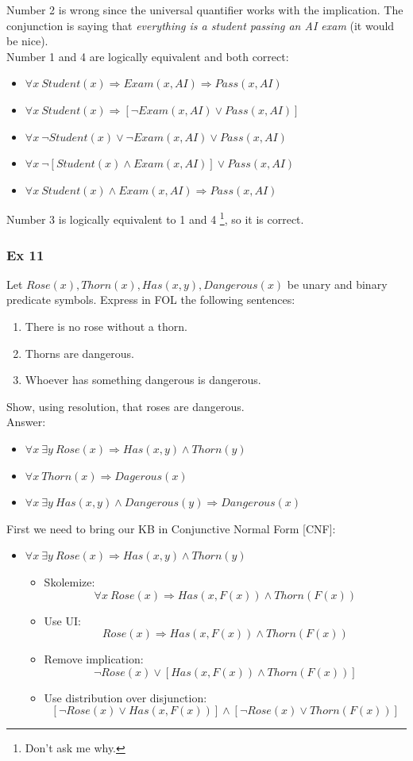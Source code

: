 \documentclass[10pt,a4paper]{article}
\begin{document}
\begin{itemize}
\begin{enumerate}
\end{enumerate}

Number 2 is wrong since the universal quantifier works with the implication. The conjunction is saying that \textit{everything is a student passing an AI exam} (it would be nice).\\
Number 1 and 4 are logically equivalent and both correct:
\begin{itemize}
\item $\forall x\ Student(x)\Rightarrow Exam(x, AI)\Rightarrow Pass(x,AI)$
\item $\forall x\ Student(x)\Rightarrow [\neg Exam(x, AI)\vee Pass(x,AI)]$
\item $\forall x\ \neg Student(x)\vee \neg Exam(x, AI)\vee Pass(x,AI)$
\item $\forall x\ \neg [Student(x)\wedge  Exam(x, AI)]\vee Pass(x,AI)$
\item $\forall x\ Student(x)\wedge  Exam(x, AI)\Rightarrow Pass(x,AI)$
\end{itemize} 
Number 3 is logically equivalent to 1 and 4 \footnote{Don't ask me why.}, so it is correct.


\subsubsection{Ex 11}
Let $Rose(x),Thorn(x), Has(x, y), Dangerous(x)$ be unary and binary predicate symbols. Express in FOL the following sentences:
\begin{enumerate}
\item There is no rose without a thorn.
\item Thorns are dangerous.
\item Whoever has something dangerous is dangerous.
\end{enumerate}
Show, using resolution, that roses are dangerous.\\

Answer:
\begin{itemize}
\item $\forall x\ \exists y \ Rose(x) \Rightarrow Has(x,y)\wedge Thorn(y)$
\item $\forall x\ Thorn(x) \Rightarrow Dagerous(x)$
\item $\forall x\ \exists y\ Has(x,y)\wedge Dangerous(y) \Rightarrow Dangerous(x)$
\end{itemize}

First we need to bring our KB in Conjunctive Normal Form [CNF]:
\begin{itemize}
\item $\forall x\ \exists y \ Rose(x) \Rightarrow Has(x,y)\wedge Thorn(y)$
\begin{itemize}
\item Skolemize:
\[\forall x\ Rose(x) \Rightarrow Has(x,F(x))\wedge Thorn(F(x))\]
\item Use UI:
\[Rose(x) \Rightarrow Has(x,F(x))\wedge Thorn(F(x))\]
\item Remove implication:
\[\neg Rose(x) \vee [Has(x,F(x))\wedge Thorn(F(x))]\]
\item Use distribution over disjunction:
\[[\neg Rose(x) \vee Has(x,F(x))] \wedge [\neg Rose(x) \vee Thorn(F(x))]\]


\end{itemize}
\end{itemize}
\end{itemize}
\end{document}
